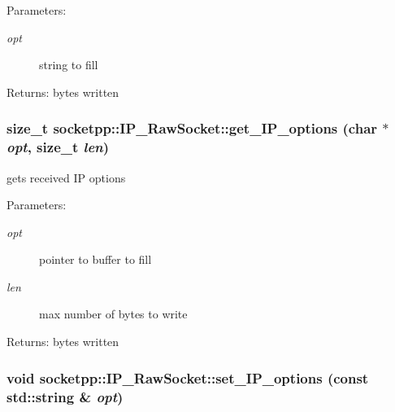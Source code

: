 \begin{Desc}
\item[Parameters:]
\begin{description}
\item[{\em opt}]string to fill \end{description}
\end{Desc}
\begin{Desc}
\item[Returns:]bytes written \end{Desc}
\hypertarget{classsocketpp_1_1IP__RawSocket_686fcc72997b0843b2ece0c4d8a5735d}{
\subsubsection[{get\_\-IP\_\-options}]{\setlength{\rightskip}{0pt plus 5cm}size\_\-t socketpp::IP\_\-RawSocket::get\_\-IP\_\-options (char $\ast$ {\em opt}, \/  size\_\-t {\em len})}}
\label{classsocketpp_1_1IP__RawSocket_686fcc72997b0843b2ece0c4d8a5735d}


gets received IP options 

\begin{Desc}
\item[Parameters:]
\begin{description}
\item[{\em opt}]pointer to buffer to fill \item[{\em len}]max number of bytes to write \end{description}
\end{Desc}
\begin{Desc}
\item[Returns:]bytes written \end{Desc}
\hypertarget{classsocketpp_1_1IP__RawSocket_9d88ecec5e362b3cf3d3dbc51d5dd0cd}{
\subsubsection[{set\_\-IP\_\-options}]{\setlength{\rightskip}{0pt plus 5cm}void socketpp::IP\_\-RawSocket::set\_\-IP\_\-options (const std::string \& {\em opt})}}
\label{classsocketpp_1_1IP__RawSocket_9d88ecec5e362b3cf3d3dbc51d5dd0cd}


